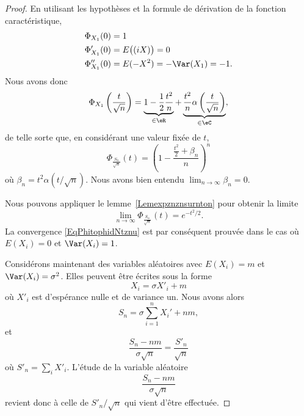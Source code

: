 \begin{proof}
	En utilisant les hypothèses et la formule de dérivation de la fonction caractéristique,
	\begin{subequations}
		\begin{align}
			\Phi_{X_1}(0)   & =1                      \\
			\Phi'_{X_1}(0)  & =E\big( (iX) \big)=0    \\
			\Phi''_{X_1}(0) & =E(-X^2)=-\Var(X_1)=-1.
		\end{align}
	\end{subequations}
	Nous avons donc
	\begin{equation}
		\Phi_{X_1}\left( \frac{ t }{ \sqrt{n} } \right)=\underbrace{1-\frac{ 1 }{2}\frac{ t^2 }{ n }}_{\in\eR}+\underbrace{\frac{ t^2 }{ n }\alpha\left( \frac{ t }{ \sqrt{n} } \right)}_{\in\eC},
	\end{equation}
	de telle sorte que, en considérant une valeur fixée de \( t\),
	\begin{equation}        \label{EqPhifracfacbetanrigh}
		\Phi_{\frac{ S_n }{ \sqrt{n} }}(t)=\left( 1-\frac{ \frac{ t^2 }{ 2 }+\beta_n }{ n } \right)^n
	\end{equation}
	où \( \beta_n=t^2\alpha(t/\sqrt{n})\). Nous avons bien entendu \( \lim_{n\to \infty} \beta_n=0\).

	Nous pouvons appliquer le lemme~\ref{Lemexpznznsurnton} pour obtenir la limite
	\begin{equation}        \label{EqlimninfySnsqrtntdsnd}
		\lim_{n\to \infty} \Phi_{\frac{ S_n }{ \sqrt{n} }}(t)= e^{-t^2/2}.
	\end{equation}
	La convergence \eqref{EqPhitophidNtznu} est par conséquent prouvée dans le cas où \( E(X_i)=0\) et \( \Var(X_i)=1\).

	Considérons maintenant des variables aléatoires avec \( E(X_i)=m\) et \( \Var(X_i)=\sigma^2\). Elles peuvent être écrites sous la forme
	\begin{equation}
		X_i=\sigma X'_i+m
	\end{equation}
	où \( X'_i\) est d'espérance nulle et de variance un. Nous avons alors
	\begin{equation}
		S_n=\sigma\sum_{i=1}^nX_i'+nm,
	\end{equation}
	et
	\begin{equation}
		\frac{ S_n-nm }{ \sigma\sqrt{n} }=\frac{ S'_n }{ \sqrt{n} }
	\end{equation}
	où \( S'_n=\sum_iX'_i\). L'étude de la variable aléatoire
	\begin{equation}
		\frac{ S_n-nm }{ \sigma\sqrt{n} }
	\end{equation}
	revient donc à celle de \( S'_n/\sqrt{n}\) qui vient d'être effectuée.
\end{proof}

